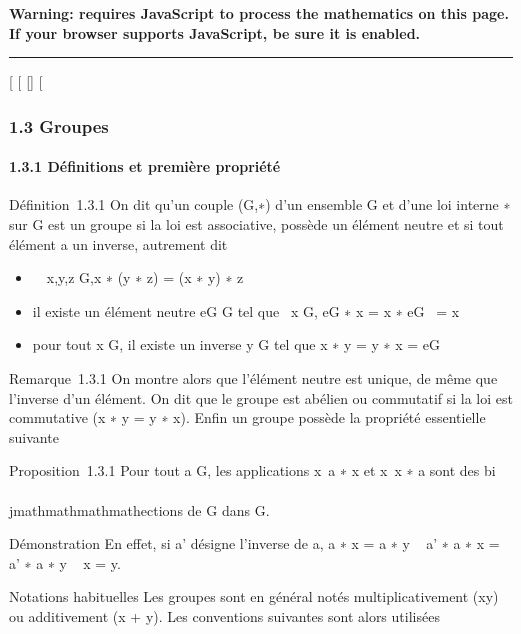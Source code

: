 \textbf{Warning: 
requires JavaScript to process the mathematics on this page.\\ If your
browser supports JavaScript, be sure it is enabled.}

\begin{center}\rule{3in}{0.4pt}\end{center}

{[}
{[}
{[}{]}
{[}

\subsubsection{1.3 Groupes}

\paragraph{1.3.1 Définitions et première propriété}

Définition~1.3.1 On dit qu'un couple (G,∗) d'un ensemble G et d'une loi
interne ∗ sur G est un groupe si la loi est associative, possède un
élément neutre et si tout élément a un inverse, autrement dit

\begin{itemize}
\itemsep1pt\parskip0pt
\item
  \forall~~x,y,z \in G,x ∗ (y ∗ z) = (x ∗ y) ∗ z
\item
  il existe un élément neutre eG \in G tel que
  \forall~x \in G, eG ∗ x = x ∗ eG~
  = x
\item
  pour tout x \in G, il existe un inverse y \in G tel que x ∗ y = y ∗ x =
  eG
\end{itemize}

Remarque~1.3.1 On montre alors que l'élément neutre est unique, de même
que l'inverse d'un élément. On dit que le groupe est abélien ou
commutatif si la loi est commutative (x ∗ y = y ∗ x). Enfin un groupe
possède la propriété essentielle suivante

Proposition~1.3.1 Pour tout a \in G, les applications
x\mapsto~a ∗ x et x\mathrel\mapsto~x ∗ a
sont des bi\\\\jmathmathmathmathections de G dans G.

Démonstration En effet, si a' désigne l'inverse de a, a ∗ x = a ∗ y \rigtharrow~ a'
∗ a ∗ x = a' ∗ a ∗ y \rigtharrow~ x = y.

Notations habituelles Les groupes sont en général notés
multiplicativement (xy) ou additivement (x + y). Les conventions
suivantes sont alors utilisées

